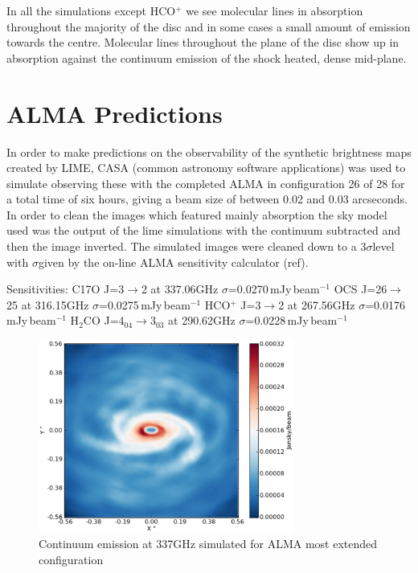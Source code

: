 \documentclass[useAMS,usenatbib]{mn2e}
\begin{document}
In all the simulations except HCO$^+$ we see molecular lines in absorption throughout the majority of the disc and in some cases a small amount of emission towards the centre. Molecular lines throughout the plane of the disc show up in absorption against the continuum emission of the shock heated, dense mid-plane. 





\section{ALMA Predictions} \label{sec:alma_predictions}

In order to make predictions on the observability of the synthetic brightness maps created by LIME, CASA (common astronomy software applications) was used to simulate observing these with the completed ALMA in configuration 26 of 28 for a total time of six hours, giving a beam size of between 0.02 and 0.03 arcseconds. In order to clean the images which featured mainly absorption the sky model used was the output of the lime simulations with the continuum subtracted and then the image inverted. The simulated images were cleaned down to a 3$\sigma$level with $\sigma$given by the on-line ALMA sensitivity calculator (ref).

Sensitivities:\newline
C17O J=3$\rightarrow$2 at 337.06GHz $\sigma$=0.0270$\,$mJy$\,$beam$^{-1}$ \newline
OCS J=26$\rightarrow$25 at 316.15GHz $\sigma$=0.0275$\,$mJy$\,$beam$^{-1}$ \newline
HCO$^+$ J=3$\rightarrow$2 at 267.56GHz $\sigma$=0.0176$\,$mJy$\,$beam$^{-1}$ \newline
H$_2$CO J=4$_{04}\rightarrow$3$_{03}$ at 290.62GHz $\sigma$=0.0228$\,$mJy$\,$beam$^{-1}$ \newline

\begin{figure}
 \includegraphics[width=84mm]{Figures/sim/casa_cont_337GHz.eps}

 \caption{Continuum emission at 337GHz simulated for ALMA most extended configuration}
 \label{continuum}
\end{figure}
\end{document}
